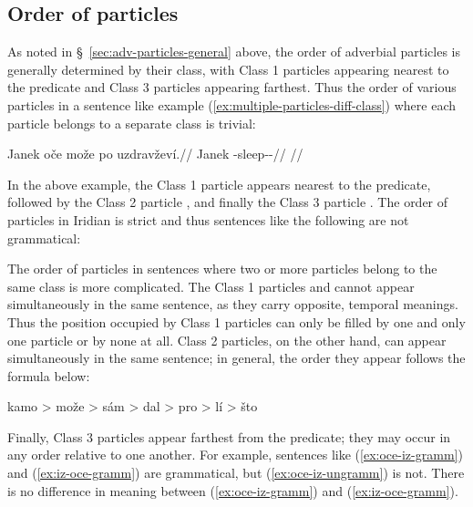 \subsection{Order of particles}\label{sec:order-of-particles}

As noted in \S~\ref{sec:adv-particles-general} above, the order of adverbial
particles is generally determined by their class, with Class 1 particles
appearing nearest to the predicate and Class 3 particles appearing farthest.
Thus the order of various particles in a sentence like example
(\ref{ex:multiple-particles-diff-class}) where each particle belongs to a
separate class is trivial:

\pex\label{ex:multiple-particles-diff-class}
\begingl
	\gla Janek oče može po uzdravževí.//
	\glb Janek \Mir{} \Add{} \Ipfv{} \Refl{}-sleep-\Av{}-\Cont{}//
	\glft {}//
\endgl
\xe

In the above example, the Class 1 particle  appears nearest to the
predicate, followed by the Class 2 particle , and finally the Class 3
particle . The order of particles in Iridian is strict and thus
sentences like the following are not grammatical:

\pex
\a \ljudge{*} 
\a \ljudge{*} 
\a \ljudge{*} 
\a \ljudge{*} 
\a \ljudge{*} 
\xe

The order of particles in sentences where two or more particles belong to the
same class is more complicated. The Class 1 particles  and 
cannot appear simultaneously in the same sentence, as they carry opposite,
temporal meanings. Thus the position occupied by Class 1 particles can only be
filled by one and only one particle or by none at all. Class 2 particles, on the
other hand, can appear simultaneously in the same sentence; in general, the
order they appear follows the formula below:

\pex\label{ex:order-of-class-2-parts}
	{\small
		kamo > može > sám > dal > pro > lí > što
	}
\xe

Finally, Class 3 particles appear farthest from the predicate; they may occur in
any order relative to one another. For example, sentences like
(\ref{ex:oce-iz-gramm}) and (\ref{ex:iz-oce-gramm}) are grammatical, but
(\ref{ex:oce-iz-ungramm}) is not. There is no difference in meaning between
(\ref{ex:oce-iz-gramm}) and (\ref{ex:iz-oce-gramm}).


